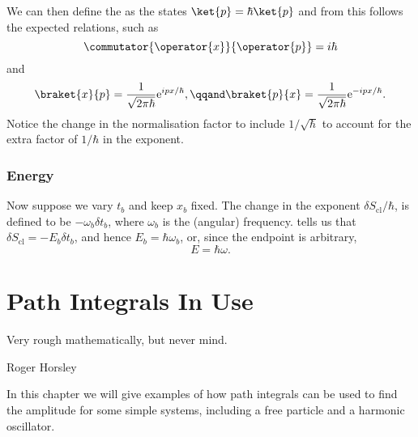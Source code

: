\documentclass[fleqn]{NotesClass}
\newcommand*{\e}{\mathrm{e}}
\newcommand*{\cl}{\mathrm{cl}}
\begin{document}
    We can then define the  as the states \(\ket{p} = \hbar\ket{p}\) and from this follows the expected relations, such as
    \begin{equation}
        \commutator{\operator{x}}{\operator{p}} = i\hbar
    \end{equation}
    and
    \begin{equation}
        \braket{x}{p} = \frac{1}{\sqrt{2\pi\hbar}} \e^{ipx/\hbar}, \qqand \braket{p}{x} = \frac{1}{\sqrt{2\pi\hbar}} \e^{-ipx/\hbar}.
    \end{equation}
    Notice the change in the normalisation factor to include \(1/\sqrt{\hbar}\) to account for the extra factor of \(1/\hbar\) in the exponent.
    
    \subsection{Energy}
    Now suppose we vary \(t_b\) and keep \(x_b\) fixed.
    The change in the exponent \(\delta S_{\cl}/\hbar\), is defined to be \(-\omega_b\delta t_b\), where \(\omega_b\) is the (angular) frequency.
     tells us that \(\delta S_{\cl} = -E_b\delta t_b\), and hence \(E_b = \hbar\omega_b\), or, since the endpoint is arbitrary,
    \begin{equation}
        E = \hbar\omega.
    \end{equation}
    
    \chapter{Path Integrals In Use}
    \epigraph{Very rough mathematically, but never mind.}{Roger Horsley}
    In this chapter we will give examples of how path integrals can be used to find the amplitude for some simple systems, including a free particle and a harmonic oscillator.
    
\end{document}
